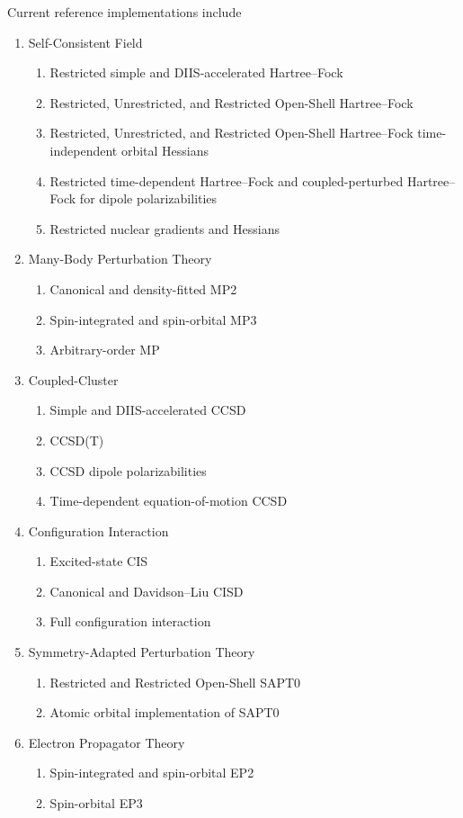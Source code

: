 Current reference implementations include
\begin{enumerate}
\item Self-Consistent Field
   \begin{enumerate}
   \item Restricted simple and DIIS\cite{25}-accelerated Hartree--Fock
   \item Restricted, Unrestricted, and Restricted Open-Shell Hartree--Fock
   \item Restricted, Unrestricted, and Restricted Open-Shell Hartree--Fock time-independent orbital Hessians
   \item Restricted time-dependent Hartree--Fock and coupled-perturbed Hartree--Fock for dipole polarizabilities
   \item Restricted nuclear gradients and Hessians
   \end{enumerate}

\item Many-Body Perturbation Theory
    \begin{enumerate}
    \item Canonical and density-fitted MP2
    \item Spin-integrated and spin-orbital MP3
    \item Arbitrary-order MP
    \end{enumerate}

\item Coupled-Cluster
    \begin{enumerate}
    \item Simple and DIIS-accelerated CCSD
    \item CCSD(T)
    \item CCSD dipole polarizabilities
    \item Time-dependent equation-of-motion CCSD
    \end{enumerate}

\item Configuration Interaction
    \begin{enumerate}
    \item Excited-state CIS
    \item Canonical and Davidson--Liu CISD
    \item Full configuration interaction
    \end{enumerate}

\item Symmetry-Adapted Perturbation Theory
    \begin{enumerate}
    \item Restricted and Restricted Open-Shell SAPT0
    \item Atomic orbital implementation of SAPT0
    \end{enumerate}

\item Electron Propagator Theory
    \begin{enumerate}
    \item Spin-integrated and spin-orbital EP2
    \item Spin-orbital EP3
    \end{enumerate}

\end{enumerate}

